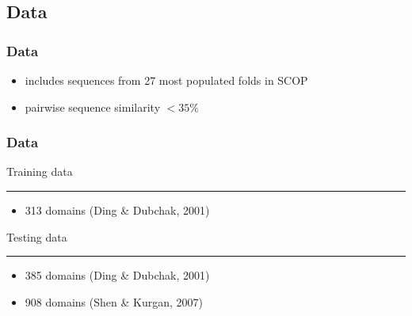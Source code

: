 \documentclass{beamer}
\begin{document}
\subsection{Data}
\begin{frame}
  \frametitle{Data}
  
  \begin{itemize}
    \item includes sequences from 27 most populated folds in SCOP
    \item pairwise sequence similarity $< 35\%$
  \end{itemize}
  
\end{frame}
\begin{frame}
  \frametitle{Data}

  {\LARGE Training data}
  \vspace{1px}
  \hrule
  \vspace{5px}
  \begin{itemize}
    \item 313 domains (Ding \& Dubchak, 2001)
  \end{itemize}
  
  \vspace{30px}
  
  {\LARGE Testing data}
  \hrule
  \vspace{5px}
  \begin{itemize}
    \item 385 domains (Ding \& Dubchak, 2001)
    \item 908 domains (Shen \& Kurgan, 2007)
  \end{itemize}
\end{frame}
\end{document}
